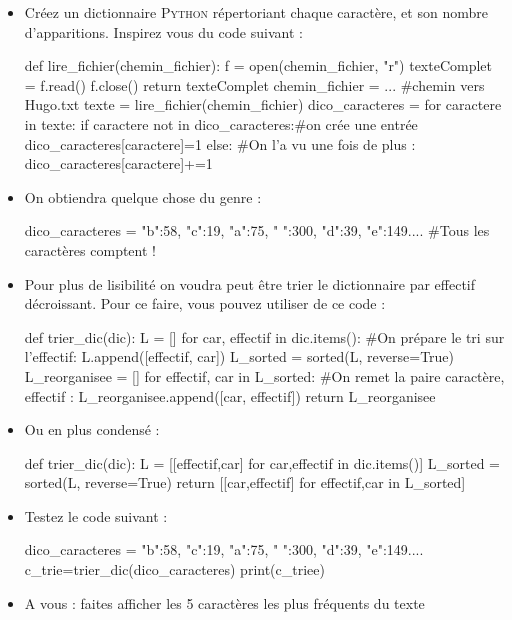 \exer
\begin{itemize}
  \item  Créez un dictionnaire \textsc{Python} répertoriant chaque caractère, et son nombre d'apparitions. Inspirez vous du code suivant :
  \begin{python}
def lire_fichier(chemin_fichier):
  f = open(chemin_fichier, "r")
  texteComplet = f.read()     
  f.close()    
  return texteComplet 
chemin_fichier = ... #chemin vers Hugo.txt
texte = lire_fichier(chemin_fichier)
dico_caracteres = {} 
for caractere in texte:
  if caractere not in dico_caracteres:#on crée une entrée
    dico_caracteres[caractere]=1
  else: #On l'a vu une fois de plus :
    dico_caracteres[caractere]+=1
\end{python}
\item On obtiendra quelque chose du genre :
\begin{python}
  dico_caracteres = {"b":58, "c":19, "a":75,
 " ":300, "d":39, "e":149....}
#Tous les caractères comptent !
\end{python}
\item Pour plus de lisibilité on voudra peut être trier le dictionnaire par effectif décroissant. Pour ce faire, vous pouvez utiliser de ce code :
\begin{python}
def trier_dic(dic):
  L = []
  for car, effectif in dic.items():
    #On prépare le tri sur l'effectif:
    L.append([effectif, car])
  L_sorted = sorted(L, reverse=True)
  L_reorganisee = []
  for effectif, car in L_sorted:
    #On remet la paire caractère, effectif :
    L_reorganisee.append([car, effectif])
  return L_reorganisee
\end{python}
\item Ou en plus condensé :
\begin{python}
def trier_dic(dic):
  L = [[effectif,car] for car,effectif in dic.items()]
  L_sorted = sorted(L, reverse=True)
  return [[car,effectif] for effectif,car in L_sorted]
\end{python}
\item Testez le code suivant :
\begin{python}
dico_caracteres = {"b":58, "c":19, "a":75,
 " ":300, "d":39, "e":149....}
c_trie=trier_dic(dico_caracteres)
print(c_triee)
\end{python}
\item A vous : faites afficher les 5 caractères les plus fréquents du texte
\end{itemize}

